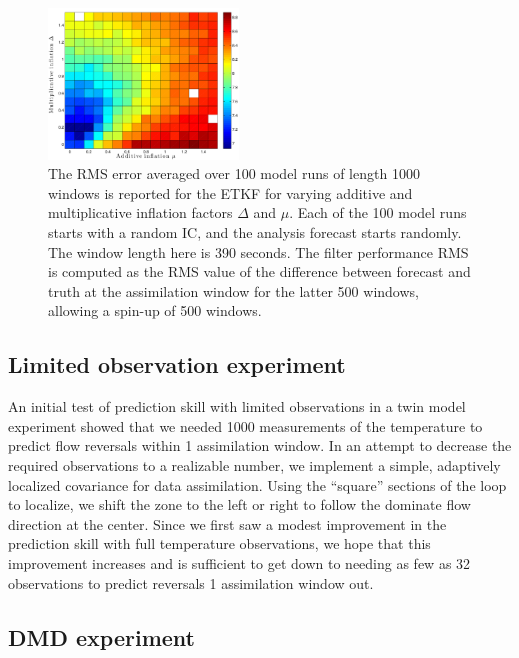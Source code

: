 \begin{figure}[h!]
  \centering
  \includegraphics[width=0.45\textwidth]{figures/ETKF_390s_infl_error.pdf}
  \caption[The RMS error averaged over 100 model runs of length 1000 windows is reported for the ETKF for varying additive and multiplicative inflation factors]{
    The RMS error averaged over 100 model runs of length 1000 windows is reported for the ETKF for varying additive and multiplicative inflation factors $\Delta$ and $\mu$.
    Each of the 100 model runs starts with a random IC, and the analysis forecast starts randomly.
    The window length here is 390 seconds.
    The filter performance RMS is computed as the RMS value of the difference between forecast and truth at the assimilation window for the latter 500 windows, allowing a spin-up of 500 windows.
  }
  \label{fig:ETKF_cov_tuning_390s}

\end{figure}

\subsection{Limited observation experiment}

An initial test of prediction skill with limited observations in a twin model experiment showed that we needed 1000 measurements of the temperature to predict flow reversals within 1 assimilation window.
In an attempt to decrease the required observations to a realizable number, we implement a simple, adaptively localized covariance for data assimilation.
Using the ``square'' sections of the loop to localize, we shift the zone to the left or right to follow the dominate flow direction at the center.
Since we first saw a modest improvement in the prediction skill with full temperature observations, we hope that this improvement increases and is sufficient to get down to needing as few as 32 observations to predict reversals 1 assimilation window out.

\subsection{DMD experiment}

